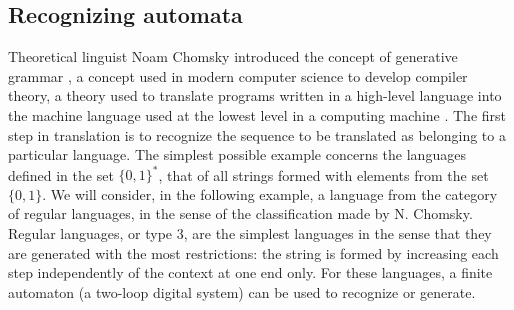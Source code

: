 \subsection{Recognizing automata}
Theoretical linguist Noam Chomsky introduced the concept of generative grammar \cite{Chomsky56, Chomsky59, Chomsky63}, a concept used in modern computer science to develop compiler theory, a theory used to translate programs written in a high-level language into the machine language used at the lowest level in a computing machine \cite{Hopcroft2001}. The first step in translation is to recognize the sequence to be translated as belonging to a particular language. The simplest possible example concerns the languages defined in the set $\{0,1\}^*$, that of all strings formed with elements from the set $\{0,1\}$. We will consider, in the following example, a language from the category of regular languages, in the sense of the classification made by N. Chomsky. Regular languages, or type 3, are the simplest languages in the sense that they are generated with the most restrictions: the string is formed by increasing each step independently of the context at one end only. For these languages, a finite automaton (a two-loop digital system) can be used to recognize or generate.

